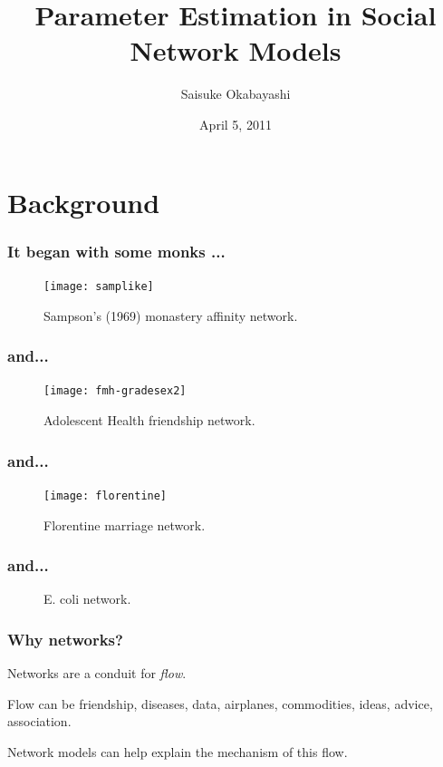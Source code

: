 \documentclass[slidestop,compress, 10pt]{beamer}
\title{Parameter Estimation in Social Network Models}
\author{
  Saisuke Okabayashi 
}
\institute{Department of Statistics \\ University of Minnesota}
\date{April 5, 2011}
\begin{document}

\frame{\titlepage}
\section{Background}


\frame
{
  \frametitle{It began with some monks ...}
\begin{figure}
\begin{center} 
\texttt{[image: samplike]}
\caption{Sampson's (1969) monastery affinity network.} 
\end{center} 
\end{figure}
}
\frame
{
  \frametitle{and... }
\begin{figure}
\begin{center} 
\texttt{[image: fmh-gradesex2]}
\caption{Adolescent Health friendship network.} 
\end{center} 
\label{fmh} 
\end{figure}
}
\frame
{
  \frametitle{and... }

\begin{figure}
\begin{center} 
\texttt{[image: florentine]}
\caption{Florentine marriage network.} 
\end{center} 
\end{figure}
}
\frame
{
  \frametitle{and...}

\begin{figure}
\begin{center} 
\caption{E. coli network.} 
\end{center} 
\end{figure}
}

\frame
{
\frametitle{Why networks?}
Networks are a conduit for \emph{flow}.  

Flow can be friendship, diseases, data, airplanes, commodities, ideas, advice, association.

Network models can help explain the mechanism of this flow.
}
\end{document}
